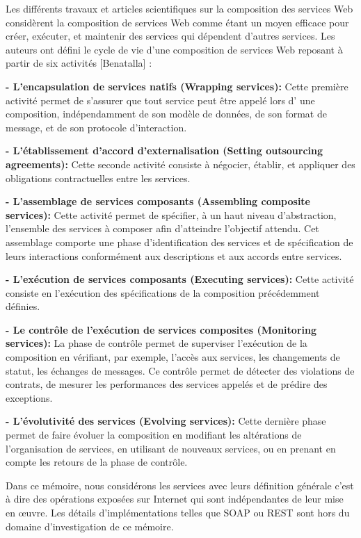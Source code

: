 Les différents travaux et articles scientifiques sur la composition des services Web considèrent la composition de services Web comme étant un moyen efficace 
pour créer, exécuter, et maintenir des services qui dépendent d’autres services. Les auteurs ont défini le cycle de vie d’une composition de services Web reposant à partir de six activités [Benatalla] \cite{6}: 

\textbf{ - L’encapsulation de services natifs (Wrapping services): }Cette première activité permet de  s’assurer que tout service peut être appelé lors d’ une composition, indépendamment de son  modèle de données, de son format de message, et de son protocole d’interaction. 


\textbf{ - L’établissement d’accord d’externalisation (Setting outsourcing agreements): } Cette seconde activité consiste à négocier, établir, et appliquer des obligations contractuelles entre les services.


\textbf{ - L’assemblage de services composants (Assembling composite services): } Cette activité permet  de spécifier, à un haut niveau d’abstraction, l’ensemble des services à composer afin d’atteindre  l’objectif attendu. Cet assemblage comporte une phase d’identification des services et de spécification de leurs interactions conformément aux descriptions et aux accords entre services. 


\textbf{ - L’exécution de services composants (Executing services): }Cette activité consiste en l’exécution des spécifications de la composition précédemment définies. 


\textbf{ - Le contrôle de l’exécution de services composites (Monitoring services):} La phase de contrôle permet de superviser l’exécution de la composition en vérifiant, par exemple, l’accès aux services, les changements de statut, les échanges de messages. Ce contrôle permet de détecter des violations de contrats, de mesurer les performances des services appelés et de prédire des exceptions. 


\textbf{ - L’évolutivité des services (Evolving services): } Cette dernière phase permet de faire évoluer la composition en modifiant les altérations de l’organisation de services, en utilisant de nouveaux  services, ou en prenant en compte les retours de la phase de contrôle. \cite{6}



Dans ce mémoire, nous considérons les services avec leurs définition générale c'est à dire des opérations exposées sur Internet qui sont indépendantes de leur mise en œuvre. Les détails d’implémentations telles que SOAP ou REST sont hors du domaine d’investigation de ce mémoire.

